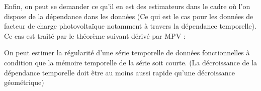 Enfin, on peut se demander ce qu'il en est des estimateurs dans le cadre où l'on dispose de la dépendance dans les données (Ce qui est le cas pour les données de facteur de charge photovoltaïque notamment à travers la dépendance temporelle). Ce cas est traîté par le théorème suivant dérivé par MPV :

\begin{thm*}

	On peut estimer la régularité d'une série temporelle de données fonctionnelles à condition que la mémoire temporelle de la série soit courte. (La décroissance de la dépendance temporelle doit être au moins aussi rapide qu'une décroissance géométrique)

	\label{thm*:far_adaptative_estimation}
\end{thm*}
